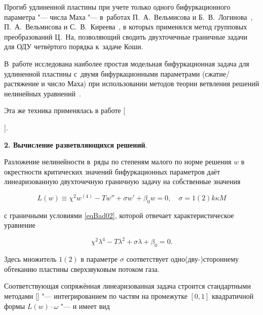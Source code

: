 Прогиб удлиненной пластины при учете только одного бифуркационного параметра "--- числа Маха "--- в~работах П.~А.~Вельмисова и Б.~В.~Логинова~\cite{badokinate:bib:VelmisovLoginov}, П.~А.~Вельмисова и С.~В.~Киреева~\cite{badokinate:bib:VelmKir}, в которых применялся метод групповых преобразований Ц.~На, позволяющий сводить двухточечные граничные задачи для ОДУ четвёртого порядка к~задаче Коши. 

В~работе \cite{badokinate:bib:LoginovKozhevnikovaTsyganov} исследована наиболее простая модельная бифуркационная задача для удлиненной пластины с~двумя бифуркационными параметрами (сжатие/растяжение и число Маха) при использовании методов теории ветвления решений нелинейных уравнений~\cite{badokinate:bib:VAT}. 

Эта же техника применялась в работе [%

].





\smallskip

\textbf{2. Вычисление разветвляющихся решений}.

Разложение нелинейности в~ряды по степеням малого по норме решения $w$ в окрестности критических значений бифуркационных параметров даёт линеаризованную двухточечную граничную задачу на собственные значения

\begin{equation}

L(w)\equiv \chi^2 w^{(4)}-T w'' +\sigma w'+ \beta_0 w=0,\quad \sigma=1(2)k\kappa M 

\label{eqBad03}

\end{equation}

с граничными условиями \eqref{eqBad02}, которой отвечает характеристическое уравнение

\begin{equation}

\chi^2 \lambda^{4}-T \lambda^2 +\sigma\lambda+ \beta_0=0 .

\label{eqBad06}

\end{equation}

Здесь множитель $1(2)$ в параметре $\sigma$ соответствует одно(дву-)стороннему обтеканию пластины сверхзвуковым потоком газа.



Соответствующая сопряжённая линеаризованная задача строится стандартными методами [] "--- интегрированием по частям на промежутке $[0, 1]$ квадратичной формы $L(w)\cdot \omega$ "--- и имеет вид 

